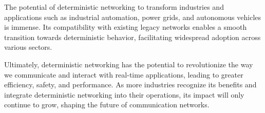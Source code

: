 \documentclass[runningheads]{llncs}
\begin{document}
The potential of deterministic networking to transform industries and applications such as industrial automation, power grids, and autonomous vehicles is immense. Its compatibility with existing legacy networks enables a smooth transition towards deterministic behavior, facilitating widespread adoption across various sectors.

Ultimately, deterministic networking has the potential to revolutionize the way we communicate and interact with real-time applications, leading to greater efficiency, safety, and performance. As more industries recognize its benefits and integrate deterministic networking into their operations, its impact will only continue to grow, shaping the future of communication networks.

\printnoidxglossary[type=acronym,sort=letter,title=Abbreviations]



\end{document}

